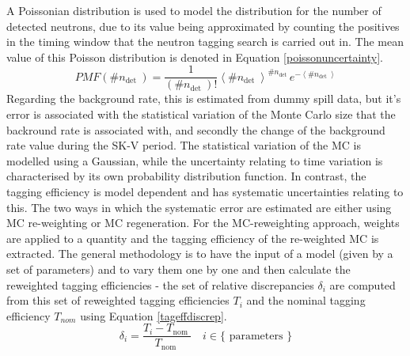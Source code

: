 \documentclass{article}
\begin{document}
A Poissonian distribution is used to model the distribution for the number of detected neutrons, due to its value being approximated by counting the positives in the timing window that the neutron tagging search is carried out in. The mean value of this Poisson distribution is denoted in Equation \eqref{poissonuncertainty}.
\newline
\begin{equation}
    P M F\left(\# n_{\text {det }}\right)=\frac{1}{\left(\# n_{\text {det }}\right) !}\left\langle \# n_{\text {det }}\right\rangle^{\# n_{\text {det }}} e^{-\left\langle \# n_{\text {det }}\right\rangle}
\label{poissonuncertainty}
\end{equation}
\newline
Regarding the background rate, this is estimated from dummy spill data, but it's error is associated with the statistical variation of the Monte Carlo size that the backround rate is associated with, and secondly the change of the background rate value during the SK-V period. The statistical variation of the MC is modelled using a Gaussian, while the uncertainty relating to time variation is characterised by its own probability distribution function. In contrast, the tagging efficiency is model dependent and has systematic uncertainties relating to this. The two ways in which the systematic error are estimated are either using MC re-weighting or MC regeneration.
\newline
For the MC-reweighting approach, weights are applied to a quantity and the tagging efficiency of the re-weighted MC is extracted. The general methodology is to have the input of a model (given by a set of parameters) and to vary them one by one and then calculate the reweighted tagging efficiencies - the set of relative discrepancies $\delta_{i}$ are computed from this set of reweighted tagging efficiencies $T_{i}$ and the nominal tagging efficiency $T_{nom}$ using Equation \eqref{tageffdiscrep}.
\newline
\begin{equation}
    \delta_{i}=\frac{T_{i}-T_{\text {nom }}}{T_{\text {nom }}} \quad i \in\{\text { parameters }\}
\label{tageffdiscrep}
\end{equation}
\newline
\end{document}
